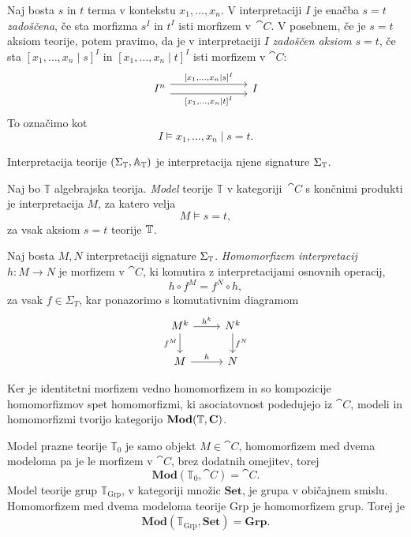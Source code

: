 \documentclass[../kategoricna_logika.tex]{subfiles}
\begin{document}
\begin{definicija}
  Naj bosta $s$ in $t$ terma v kontekstu $x_1, \ldots, x_n$.  V
  interpretaciji $I$ je enačba $s = t$ \emph{zadoščena}, če sta
  morfizma $s^I$ in $t^I$ isti morfizem v~$\cat{C}$.  V posebnem, če
  je $s = t$ aksiom teorije, potem pravimo, da je v
  interpretaciji $I$ \emph{zadoščen aksiom} $s = t$, če sta
  $[x_1, \ldots, x_n \mid s]^I$ in $[x_1, \ldots, x_n \mid t]^I$ isti
  morfizem v $\cat{C}$:
  \begin{equation*}
    \begin{tikzcd}[column sep = 7em]
      I^n \ar[r, shift left=1ex, "{[x_1, \ldots, x_n \mid s]^I}"]
      \ar[r, shift right=1ex, "{[x_1, \ldots, x_n \mid t]^I}"'] & I
    \end{tikzcd}
  \end{equation*}
  To označimo kot
  \[I \models x_1, \ldots, x_n \mid s = t.\] 
\end{definicija}
%
\begin{definicija}
Interpretacija teorije $(\Sigma_{\mathbb{T}}, \mathbb{A}_{\mathbb{T}})$ je interpretacija njene signature $\Sigma_{\mathbb{T}}$.
\end{definicija}
\begin{definicija}
Naj bo $\mathbb{T}$ algebrajska teorija.
\emph{Model} teorije $\mathbb{T}$ v kategoriji~$\cat{C}$ s
končnimi produkti je interpretacija $M$, za katero velja
$$M \models s = t,$$
za vsak aksiom $s = t$ teorije $\mathbb{T}$.
\end{definicija}
%
\begin{definicija}
  Naj bosta $M, N$ interpretaciji signature $\Sigma_{\mathbb{T}}$.
 \emph{Homomorfizem interpretacij} $h : M \to N$ je morfizem v
 $\cat{C}$, ki komutira z interpretacijami osnovnih operacij,
$$h \circ f^M = f^N \circ h,$$
za vsak $f \in \Sigma_T$, kar ponazorimo s komutativnim diagramom
\begin{equation*}
  \begin{tikzcd}
    M^k \ar[d, "f^M"'] \ar[r, "h^k"] & N^k \ar[d, "f^N"] \\
    M \ar[r, "h"] & N
  \end{tikzcd}
\end{equation*}
\end{definicija}
\noindent
Ker je identitetni morfizem vedno homomorfizem in so kompozicije homomorfizmov spet homomorfizmi,
ki asociatovnost podedujejo iz $\cat{C}$, modeli in homomorfizmi tvorijo kategorijo $\mathbf{Mod}(\mathbb{T},{\operatorname{\mathbf{C}}})$.
%
\begin{primer}
  Model prazne teorije $\mathbb{T}_0$ je samo objekt $M \in \cat{C}$,
  homomorfizem med dvema modeloma pa je le morfizem v $\cat{C}$, brez
  dodatnih omejitev, torej
$$\mathbf{Mod}(\mathbb{T}_0, \cat{C}) = \cat{C}.$$
%
Model teorije grup $\mathbb{T}_{\mathrm{Grp}}$, v kategoriji množic
$\mathbf{Set}$, je grupa v običajnem smislu. Homomorfizem med dvema modeloma
teorije $\mathrm{Grp}$ je homomorfizem grup. Torej je
$$\mathbf{Mod}(\mathbb{T}_{\mathrm{Grp}}, \mathbf{Set}) = \mathbf{Grp}.$$
\end{primer}
\end{document}
